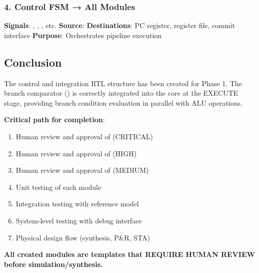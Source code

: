 \subsubsection{4. Control FSM → All Modules}\label{cr:fix:cpu-integration-summary:4-control-fsm-all-modules}

\begin{record}

\textbf{Signals}: , ,
, etc. \textbf{Source}: 
\textbf{Destinations}: PC register, register file, commit interface
\textbf{Purpose}: Orchestrates pipeline execution

\end{record}

\subsection{Conclusion}\label{cr:fix:cpu-integration-summary:conclusion}

\begin{record}

The control and integration RTL structure has been created for Phase 1.
The branch comparator () is correctly
integrated into the core at the EXECUTE stage, providing branch
condition evaluation in parallel with ALU operations.

\textbf{Critical path for completion}:

\begin{enumerate}
\def\labelenumi{\arabic{enumi}.}
\tightlist
\item
  Human review and approval of  (CRITICAL)
\item
  Human review and approval of  (HIGH)
\item
  Human review and approval of  (MEDIUM)
\item
  Unit testing of each module
\item
  Integration testing with reference model
\item
  System-level testing with debug interface
\item
  Physical design flow (synthesis, P\&R, STA)
\end{enumerate}

\textbf{All created modules are templates that REQUIRE HUMAN REVIEW
before simulation/\allowbreak{}synthesis.}

\end{record}

